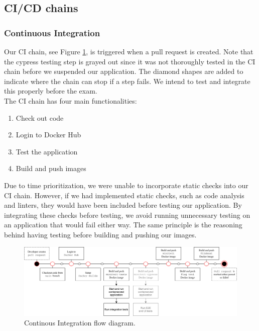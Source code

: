 \subsection{CI/CD chains} 



\subsubsection{Continuous Integration}

Our CI chain, see Figure \ref{fig:ci}, is triggered when a pull request is created. Note that the cypress testing step is grayed out since it was not thoroughly tested in the CI chain before we suspended our application. The diamond shapes are added to indicate where the chain can stop if a step fails. We intend to test and integrate this properly before the exam.\\ 

\noindent The CI chain has four main functionalities:

\begin{enumerate}
    \item Check out code 
    \item Login to Docker Hub
    \item Test the application
    \item Build and push images
\end{enumerate}

Due to time prioritization, we were unable to incorporate static checks into our CI chain. However, if we had implemented static checks, such as code analysis and linters, they would have been included before testing our application. By integrating these checks before testing, we avoid running unnecessary testing on an application that would fail either way. The same principle is the reasoning behind having testing before building and pushing our images.

\begin{figure}[H]
    \centering
    \includegraphics[width=\linewidth]{images/ci-flow.png} 
    \caption{Continous Integration flow diagram.}
    \label{fig:ci}
\end{figure}

